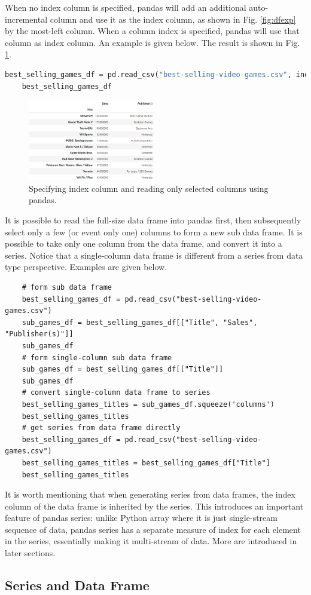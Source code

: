 When no index column is specified, pandas will add an additional auto-incremental column and use it as the index column, as shown in Fig. \ref{fig:dfexp} by the most-left column. When a column index is specified, pandas will use that column as index column. An example is given below. The result is shown in Fig. \ref{fig:dfex2}.
\begin{lstlisting}[language=python]
	best_selling_games_df = pd.read_csv("best-selling-video-games.csv", index_col = "Title", usecols = ["Title", "Sales", "Publisher(s)"])
	best_selling_games_df
\end{lstlisting}
\begin{figure}[htbp]
	\centering
	\includegraphics[width=0.5\textwidth]{./chapters/ch-python/figures/df_example2.png}
	\caption{Specifying index column and reading only selected columns using pandas.}
	\label{fig:dfex2}
\end{figure}

It is possible to read the full-size data frame into pandas first, then subsequently select only a few (or event only one) columns to form a new sub data frame. It is possible to take only one column from the data frame, and convert it into a series. Notice that a single-column data frame is different from a series from data type perspective. Examples are given below.
\begin{lstlisting}
	# form sub data frame
	best_selling_games_df = pd.read_csv("best-selling-video-games.csv")
	sub_games_df = best_selling_games_df[["Title", "Sales", "Publisher(s)"]]
	sub_games_df
	# form single-column sub data frame
	sub_games_df = best_selling_games_df[["Title"]]
	sub_games_df
	# convert single-column data frame to series
	best_selling_games_titles = sub_games_df.squeeze('columns')
	best_selling_games_titles
	# get series from data frame directly
	best_selling_games_df = pd.read_csv("best-selling-video-games.csv")
	best_selling_games_titles = best_selling_games_df["Title"]
	best_selling_games_titles
\end{lstlisting}

It is worth mentioning that when generating series from data frames, the index column of the data frame is inherited by the series. This introduces an important feature of pandas series: unlike Python array where it is just single-stream sequence of data, pandas series has a separate measure of index for each element in the series, essentially making it multi-stream of data. More are introduced in later sections.

\subsection{Series and Data Frame}
